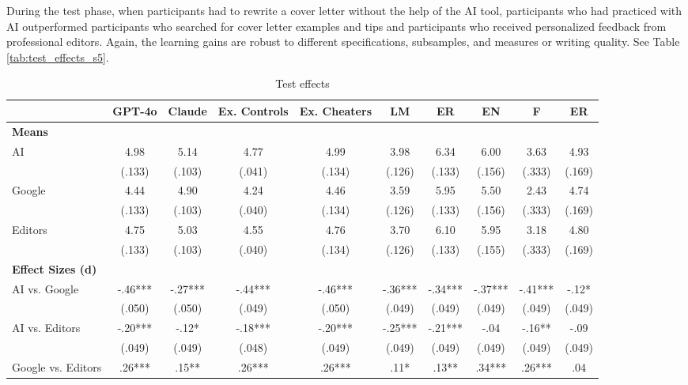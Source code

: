 \documentclass[11pt]{report}
\begin{document}
\begin{append}
During the test phase, when participants had to rewrite a cover letter without the help of the AI tool, participants who had practiced with AI outperformed participants who searched for cover letter examples and tips and participants who received personalized feedback from professional editors. Again, the learning gains are robust to different specifications, subsamples, and measures or writing quality. See Table     \ref{tab:test_effects_s5}.
\begin{landscape}

\begin{table}[]


    \centering
        \caption{Test effects}
    \begin{tabular}{lccccccccc}
\toprule
  & GPT-4o & Claude & Ex. Controls & Ex. Cheaters & LM & ER & EN & F & ER \\ 
\midrule
\multicolumn{10}{l}{\textbf{Means}} \\[2.5pt] 
\midrule
{AI} & {4.98} & {5.14} & {4.77} & {4.99} & {3.98} & {6.34} & {6.00} & {3.63} & {4.93} \\ 
{} & {(.133)} & {(.103)} & {(.041)} & {(.134)} & {(.126)} & {(.133)} & {(.156)} & {(.333)} & {(.169)} \\ 
{Google} & {4.44} & {4.90} & {4.24} & {4.46} & {3.59} & {5.95} & {5.50} & {2.43} & {4.74} \\ 
{} & {(.133)} & {(.103)} & {(.040)} & {(.134)} & {(.126)} & {(.133)} & {(.156)} & {(.333)} & {(.169)} \\ 
{Editors} & {4.75} & {5.03} & {4.55} & {4.76} & {3.70} & {6.10} & {5.95} & {3.18} & {4.80} \\ 
{} & {(.133)} & {(.103)} & {(.040)} & {(.134)} & {(.126)} & {(.133)} & {(.155)} & {(.333)} & {(.169)} \\ 
\midrule
\multicolumn{10}{l}{\textbf{Effect Sizes (d)}} \\[2.5pt] 
\midrule
{AI vs. Google} & {-.46***} & {-.27***} & {-.44***} & {-.46***} & {-.36***} & {-.34***} & {-.37***} & {-.41***} & {-.12*} \\ 
{} & {(.050)} & {(.050)} & {(.049)} & {(.050)} & {(.049)} & {(.049)} & {(.049)} & {(.049)} & {(.049)} \\ 
{AI vs. Editors} & {-.20***} & {-.12*} & {-.18***} & {-.20***} & {-.25***} & {-.21***} & {-.04} & {-.16**} & {-.09} \\ 
{} & {(.049)} & {(.049)} & {(.048)} & {(.049)} & {(.049)} & {(.049)} & {(.049)} & {(.049)} & {(.049)} \\ 
{Google vs. Editors} & {.26***} & {.15**} & {.26***} & {.26***} & {.11*} & {.13**} & {.34***} & {.26***} & {.04} \\ 

\end{tabular}
\end{table}
\end{landscape}
\end{append}
\end{document}
